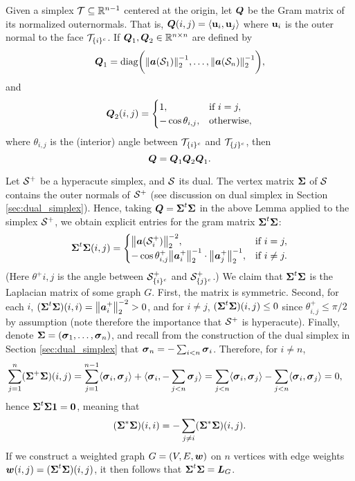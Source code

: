 
\begin{lemma}
Given a simplex $\mathcal{T}\subseteq\mathbb{R}^{n-1}$ centered at the origin, let $\vb*{Q}$ be the Gram matrix of its normalized outernormals. That is, $\vb*{Q}(i,j)=\langle \vb{u}_i,\vb{u}_j\rangle$ where $\vb{u}_{i}$ is the outer normal to the face $\mathcal{T}_{\{i\}^c}$. If $\vb*{Q}_1,\vb*{Q}_2\in\mathbb{R}^{n\times n}$ are defined by 
\begin{equation*}
\vb*{Q}_1 = \text{diag}\bigg(\norm{\vb*{a}(\mathcal{S}_1)}_2^{-1},\dots,\norm{\vb*{a}(\mathcal{S}_n)}_2^{-1}\bigg),
\end{equation*}
and 
\begin{equation*}
\vb*{Q}_2(i,j) = \begin{cases}
1,& \text{if } i=j,\\
-\cos\theta_{i,j},&\text{otherwise},
\end{cases} 
\end{equation*}
where $\theta_{i,j}$ is the (interior) angle between $\mathcal{T}_{\{i\}^c}$ and $\mathcal{T}_{\{j\}^c}$, then 
\begin{equation*}
\vb*{Q} = \vb*{Q}_1 \vb*{Q}_2 \vb*{Q}_1.
\end{equation*}
\end{lemma}


Let $\mathcal{S}^+$ be a hyperacute simplex, and $\mathcal{S}$ its dual. The vertex matrix $\boldsymbol{\Sigma}$ of $\mathcal{S}$ contains the outer normals of $\mathcal{S}^+$ (see discussion on dual simplex in Section \ref{sec:dual_simplex}). Hence, taking $\vb*{Q}=\boldsymbol{\Sigma}^t \boldsymbol{\Sigma}$ in the above Lemma applied to the simplex $\mathcal{S}^+$, we obtain explicit entries for the gram matrix $\boldsymbol{\Sigma}^t\boldsymbol{\Sigma}$: 
\begin{equation*}
    \boldsymbol{\Sigma}^t \boldsymbol{\Sigma}(i,j) = \begin{cases}
    \norm{\vb*{a}(\mathcal{S}_i^+)}_2^{-2},& \text{if }i=j,\\
-\cos\theta^+_{i,j} \norm{\vb*{a}_i^+}_2^{-1}\cdot \norm{\vb*{a}_j^+}_2^{-1},& \text{if }i\neq j.
    \end{cases}
\end{equation*}
(Here $\theta^+{i,j}$ is the angle between $\mathcal{S}_{\{i\}^c}^+$ and $\mathcal{S}_{\{j\}^c}^+$.)
We claim that $\boldsymbol{\Sigma}^t\boldsymbol{\Sigma}$ is the Laplacian matrix of some graph $G$. First, the matrix is symmetric. Second,
for each $i$, $(\boldsymbol{\Sigma}^t\boldsymbol{\Sigma})(i,i)=\norm{\vb*{a}_i^+}_2^{-2}>0$, and for $i\neq j$, $(\boldsymbol{\Sigma}^t\boldsymbol{\Sigma})(i,j) \leq 0$ since $\theta^+_{i,j}\leq \pi/2$ by assumption (note therefore the importance that $\mathcal{S}^+$ is hyperacute). Finally, denote $\boldsymbol{\Sigma}=(\vb*{\sigma}_1,\dots,\vb*{\sigma}_n)$, and recall from the construction of the dual simplex in Section \ref{sec:dual_simplex} that $\vb*{\sigma}_n=-\sum_{i<n}\vb*{\sigma}_i$. Therefore, for $i\neq n$, 
\begin{align*}
    \sum_{j=1}^n (\boldsymbol{\Sigma}^+\boldsymbol{\Sigma})(i,j) &= \sum_{j=1}^{n-1} \langle \vb*{\sigma}_i,\vb*{\sigma}_j\rangle + \langle \vb*{\sigma}_i,-\sum_{j<n}\vb*{\sigma}_j\rangle = \sum_{j<n}\langle \vb*{\sigma}_i,\vb*{\sigma}_j\rangle - \sum_{j<n}\langle \vb*{\sigma}_i,\vb*{\sigma}_j\rangle  = 0,
\end{align*}
hence $\boldsymbol{\Sigma}^t\boldsymbol{\Sigma}\vb{1}=\vb{0}$, meaning that 
\[(\boldsymbol{\Sigma}^*\boldsymbol{\Sigma})(i,i) = -\sum_{j\neq i}(\boldsymbol{\Sigma}^*\boldsymbol{\Sigma})(i,j).\]
If we construct a weighted graph $G=(V,E,\vb*{w})$ on $n$ vertices with edge weights $\vb*{w}(i,j) = (\boldsymbol{\Sigma}^t\boldsymbol{\Sigma})(i,j)$, it then follows that $\boldsymbol{\Sigma}^t\boldsymbol{\Sigma}=\vb*{L}_G$. 

